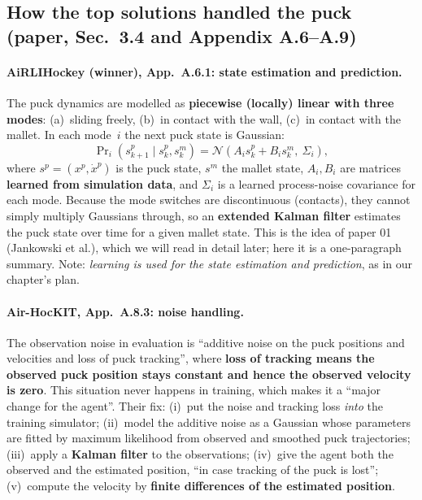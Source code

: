 \documentclass[11pt,a4paper]{article}
\begin{document}
\subsection{How the top solutions handled the puck (paper, Sec.~3.4 and Appendix A.6--A.9)}
\label{sec:solutions}

\paragraph{AiRLIHockey (winner), App.~A.6.1: state estimation and prediction.}
The puck dynamics are modelled as \textbf{piecewise (locally) linear with three modes}:
(a)~sliding freely, (b)~in contact with the wall, (c)~in contact with the mallet. In each mode~$i$
the next puck state is Gaussian:
\[
\Pr\nolimits_i\!\left(s^p_{k+1}\mid s^p_k,s^m_k\right)=\mathcal N\!\left(A_i s^p_k+B_i s^m_k,\ \Sigma_i\right),
\]
where $s^p=(x^p,\dot x^p)$ is the puck state, $s^m$ the mallet state, $A_i,B_i$ are matrices
\textbf{learned from simulation data}, and $\Sigma_i$ is a learned process-noise covariance for
each mode. Because the mode switches are discontinuous (contacts), they cannot simply multiply
Gaussians through, so an \textbf{extended Kalman filter} estimates the puck state over time for a
given mallet state. This is the idea of paper 01 (Jankowski et al.), which we will read in detail
later; here it is a one-paragraph summary. Note: \emph{learning is used for the state estimation and
prediction}, as in our chapter's plan.

\paragraph{Air-HocKIT, App.~A.8.3: noise handling.}
The observation noise in evaluation is ``additive noise on the puck positions and velocities and
loss of puck tracking'', where \textbf{loss of tracking means the observed puck position stays
constant and hence the observed velocity is zero}. This situation never happens in training, which
makes it a ``major change for the agent''. Their fix: (i)~put the noise and tracking loss
\emph{into} the training simulator; (ii)~model the additive noise as a Gaussian whose parameters
are fitted by maximum likelihood from observed and smoothed puck trajectories; (iii)~apply a
\textbf{Kalman filter} to the observations; (iv)~give the agent both the observed and the
estimated position, ``in case tracking of the puck is lost''; (v)~compute the velocity by
\textbf{finite differences of the estimated position}.
\end{document}
